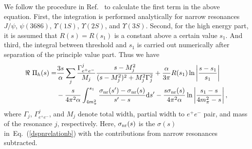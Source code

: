 \documentclass[aps,showpacs,superscriptaddress,preprint,tightenlines]{revtex4}
\newcommand{\EE}{e^+e^-}
\newcommand{\psip}{\psi(3686)}
\newcommand{\jpsi}{J/\psi}
\newcommand\Eq[1]{Eq.~\eref{#1}}
\def\eref#1{(\ref{#1})}
\begin{document}
We follow the procedure in Ref.~\cite{Berends_vp} to calculate 
the first term in the above equation. First, the integration 
is performed analytically for
narrow resonances $\jpsi$, $\psip$, $\Upsilon(1S)$,
$\Upsilon(2S)$, and $\Upsilon(3S)$. Second, for the high energy
part, it is assumed that $R(s)=R(s_1)$ is a constant above a
certain value $s_1$. And third, the integral between threshold and
$s_1$ is carried out numerically after separation of the principle
value part. Thus we have
\begin{align}
\Re~ \Pi_h(s)=& \frac{3s}{\alpha} \sum\limits_{j}
\frac{\Gamma^j_{\EE}}{M_j}\frac{s -M_j^2}{(s -M_j^2)^2 + M_j^2 \Gamma_j^2}
+\frac{\alpha}{3\pi} R(s_1)\ln\left|\frac{s-s_1}{s_1}\right|\notag\\
&- \frac{s}{4\pi^2 \alpha}
 \int_{4m^2_{\pi}}^{s_1} \frac{\sigma_{\rm nr} (s^{\prime})-\sigma_{\rm nr} (s)}
 {s^{\prime}-s}\mathrm{d} s^{\prime} -\frac{s\sigma_{\rm nr} (s)}{4\pi^2 \alpha}
 \ln \left|\frac{s_1-s}{4m^2_{\pi}-s}\right| ,\label{eq:piexpressiona}
\end{align}
where $\Gamma_j$, $\Gamma^j_{\EE}$, and $M_j$ denote total width,
partial width to $\EE$ pair, and mass of the resonance $j$,
respectively. Here, $\sigma_{\rm nr} (s)$ is the $\sigma (s)$ 
in~\Eq{dspnrelationb} with the contributions from narrow
resonances subtracted.
\end{document}
